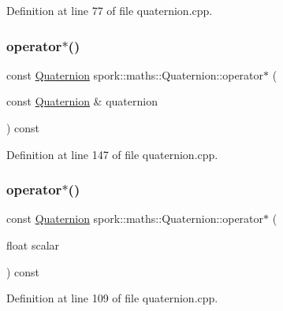 Definition at line 77 of file quaternion.\+cpp.

\mbox{\label{structspork_1_1maths_1_1_quaternion_ad818b807a969dbc6f97bdd43aba26fd5}} 
\subsubsection{\texorpdfstring{operator$\ast$()}{operator*()}\hspace{0.1cm}{\footnotesize\ttfamily [1/2]}}
{\footnotesize\ttfamily const \hyperlink{structspork_1_1maths_1_1_quaternion}{Quaternion} spork\+::maths\+::\+Quaternion\+::operator$\ast$ (\begin{DoxyParamCaption}\item[{const \hyperlink{structspork_1_1maths_1_1_quaternion}{Quaternion} \&}]{quaternion }\end{DoxyParamCaption}) const}



Definition at line 147 of file quaternion.\+cpp.

\mbox{\label{structspork_1_1maths_1_1_quaternion_a44b376d43e6809b36c13c6700f4c3b7b}} 
\subsubsection{\texorpdfstring{operator$\ast$()}{operator*()}\hspace{0.1cm}{\footnotesize\ttfamily [2/2]}}
{\footnotesize\ttfamily const \hyperlink{structspork_1_1maths_1_1_quaternion}{Quaternion} spork\+::maths\+::\+Quaternion\+::operator$\ast$ (\begin{DoxyParamCaption}\item[{float}]{scalar }\end{DoxyParamCaption}) const}



Definition at line 109 of file quaternion.\+cpp.

\mbox{\label{structspork_1_1maths_1_1_quaternion_a037e6cfa22a82ecf57dc262088674f00}} 
